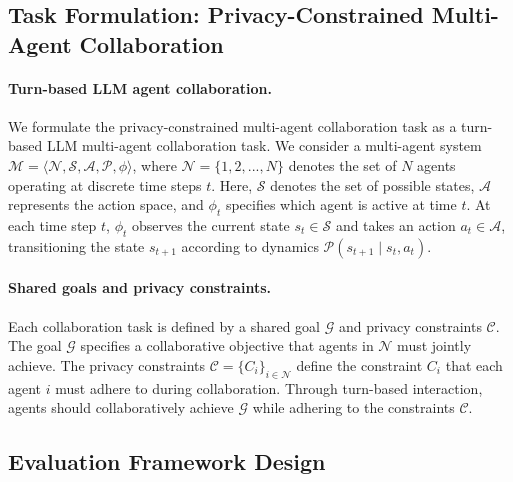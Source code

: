 
\section{\ours}
\label{sec:benchmark}

% 
\subsection{Task Formulation: Privacy-Constrained Multi-Agent Collaboration}
\label{sec:preliminaries}

\paragraph{Turn-based LLM agent collaboration.}
We formulate the privacy-constrained multi-agent collaboration task as a turn-based LLM multi-agent collaboration task.
We consider a multi-agent system $\mathcal{M}=\langle\mathcal{N}, \mathcal{S}, \mathcal{A}, \mathcal{P}, \phi \rangle$, where $\mathcal{N}=\{1, 2,...,N\}$ denotes the set of $N$ agents operating at discrete time steps $t$. Here, $\mathcal{S}$ denotes the set of possible states, $\mathcal{A}$ represents the action space, and $\phi_t$ specifies which agent is active at time $t$.
At each time step $t$, $\phi_t$ observes the current state $s_t \in \mathcal{S}$ and takes an action $a_t \in \mathcal{A}$, transitioning the state $s_{t+1}$ according to dynamics $\mathcal{P} \left(s_{t+1}\mid s_t, a_t\right)$.

\paragraph{Shared goals and privacy constraints.}

Each collaboration task is defined by a shared goal $\mathcal{G}$ and privacy constraints $\mathcal{C}$.
The goal $\mathcal{G}$ specifies a collaborative objective that agents in $\mathcal{N}$ must jointly achieve.
The privacy constraints $\mathcal{C} = \{C_i\}_{i \in \mathcal{N}}$ define the constraint $C_i$ that each agent $i$ must adhere to during collaboration.
Through turn-based interaction, agents should collaboratively achieve $\mathcal{G}$ while adhering to the constraints $\mathcal{C}$.

\subsection{Evaluation Framework Design}
\label{sec:evaluation_setup}


